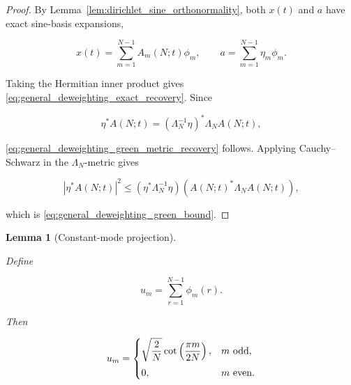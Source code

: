 \documentclass[11pt]{amsart}
\numberwithin{equation}{section}
\theoremstyle{plain}
\newtheorem{lemma}[theorem]{Lemma}
\theoremstyle{definition}
\theoremstyle{remark}
\begin{document}
\begin{proof}
By Lemma~\ref{lem:dirichlet_sine_orthonormality}, both \(x(t)\) and
\(a\) have exact sine-basis expansions,

\begin{equation}
x(t)=\sum_{m=1}^{N-1}A_m(N;t)\phi_m,
\qquad
a=\sum_{m=1}^{N-1}\eta_m\phi_m.
\end{equation}

Taking the Hermitian inner product gives
\eqref{eq:general_deweighting_exact_recovery}. Since

\begin{equation}
\eta^*A(N;t)
=
(\Lambda_N^{-1}\eta)^*\Lambda_NA(N;t),
\end{equation}

\eqref{eq:general_deweighting_green_metric_recovery} follows. Applying
Cauchy--Schwarz in the \(\Lambda_N\)-metric gives

\begin{equation}
|\eta^*A(N;t)|^2
\le
(\eta^*\Lambda_N^{-1}\eta)
(A(N;t)^*\Lambda_NA(N;t)),
\end{equation}

which is \eqref{eq:general_deweighting_green_bound}.
\end{proof}

\begin{lemma}[Constant-mode projection]
\label{lem:constant_mode_projection}

Define

\begin{equation}
u_m
=
\sum_{r=1}^{N-1}\phi_m(r).
\label{eq:constant_mode_projection_um}
\end{equation}

Then

\begin{equation}
u_m
=
\begin{cases}
\displaystyle
\sqrt{\dfrac2N}
\cot\left(\dfrac{\pi m}{2N}\right),
&
m\ {\rm odd},
\\[8pt]
0,
&
m\ {\rm even}.
\end{cases}
\label{eq:constant_mode_coefficients_um}
\end{equation}

\end{lemma}
\end{document}
